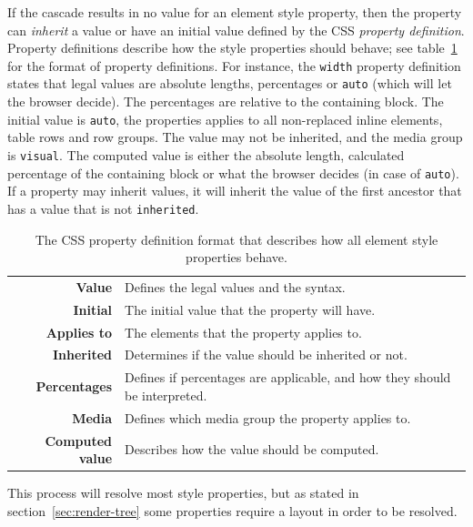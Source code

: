 \documentclass[a4paper,11pt]{kth-mag}
\newcommand{\code}[1]{\texttt{#1}}
\begin{document}
        If the cascade results in no value for an \gls{element} style property, then the property can \emph{inherit} a value or have an initial value defined by the \gls{CSS} \emph{property definition}.
        Property definitions describe how the style properties should behave; see table~\ref{table:css_property_definition} for the format of property definitions.
        For instance, the \code{width} property definition states that legal values are absolute lengths, percentages or \code{auto} (which will let the \gls{browser} decide).
        The percentages are relative to the containing block.
        The initial value is \code{auto}, the properties applies to all non-replaced inline \glspl{element}, table rows and row groups.
        The value may not be inherited, and the media group is \code{visual}.
        The computed value is either the absolute length, calculated percentage of the containing block or what the \gls{browser} decides (in case of \code{auto}).
        If a property may inherit values, it will inherit the value of the first ancestor that has a value that is not \code{inherited}.

        \begin{table}[ht]\center
          \tiny
          \begin{tabular}[t]{ r | l }
            \textbf{Value} & Defines the legal values and the syntax. \\
            \textbf{Initial} & The initial value that the property will have. \\
            \textbf{Applies to} & The \glspl{element} that the property applies to. \\
            \textbf{Inherited} & Determines if the value should be inherited or not. \\
            \textbf{Percentages} & Defines if percentages are applicable, and how they should be interpreted. \\
            \textbf{Media} & Defines which media group the property applies to. \\
            \textbf{Computed value} & Describes how the value should be computed. \\
          \end{tabular}
          \caption{The \gls{CSS} property definition format that describes how all \gls{element} style properties behave.}
          \label{table:css_property_definition}
        \end{table}

        This process will resolve most style properties, but as stated in section~\ref{sec:render-tree} some properties require a layout in order to be resolved.
\end{document}
